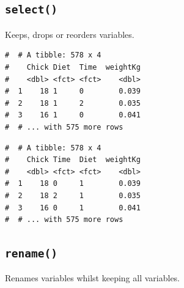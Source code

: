 \documentclass[a4paper,9pt,twocolumn,twoside,printwatermark=false]{pinp}
\begin{document}
\subsection{\texorpdfstring{\texttt{select()}}{select()}}\label{select}

Keeps, drops or reorders variables.

\begin{Shaded}
\begin{Highlighting}[]
\OperatorTok{-}
\end{Highlighting}
\end{Shaded}

\begin{ShadedResult}
\begin{verbatim}
#  # A tibble: 578 x 4
#    Chick Diet  Time  weightKg
#    <dbl> <fct> <fct>    <dbl>
#  1    18 1     0        0.039
#  2    18 1     2        0.035
#  3    16 1     0        0.041
#  # ... with 575 more rows
\end{verbatim}
\end{ShadedResult}

\begin{Shaded}
\begin{Highlighting}[]
\end{Highlighting}
\end{Shaded}

\begin{ShadedResult}
\begin{verbatim}
#  # A tibble: 578 x 4
#    Chick Time  Diet  weightKg
#    <dbl> <fct> <fct>    <dbl>
#  1    18 0     1        0.039
#  2    18 2     1        0.035
#  3    16 0     1        0.041
#  # ... with 575 more rows
\end{verbatim}
\end{ShadedResult}

\subsection{\texorpdfstring{\texttt{rename()}}{rename()}}\label{rename}

Renames variables whilst keeping all variables.

\begin{Shaded}
\begin{Highlighting}[]
\end{Highlighting}
\end{Shaded}
\end{document}
